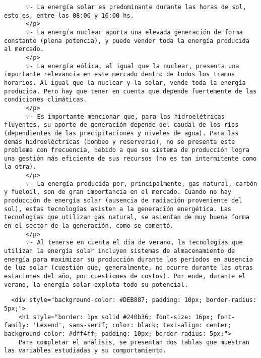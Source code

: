 \documentclass[11pt]{article}
\begin{document}
\begin{verbatim}
      💡- La energía solar es predominante durante las horas de sol, esto es, entre las 08:00 y 16:00 hs.
      </p>
      💡- La energía nuclear aporta una elevada generación de forma constante (plena potencia), y puede vender toda la energía producida al mercado.
      </p>
      💡- La energía eólica, al igual que la nuclear, presenta una importante relevancia en este mercado dentro de todos los tramos horarios. Al igual que la nuclear y la solar, vende toda la energía producida. Pero hay que tener en cuenta que depende fuertemente de las condiciones climáticas.
      </p>
      💡- Es importante mencionar que, para las hidroelétricas fluyentes, su aporte de generación depende del caudal de los ríos (dependientes de las precipitaciones y niveles de agua). Para las demás hidroeléctricas (bombeo y reservorio), no se presenta este problema con frecuencia, debido a que su sistema de producción logra una gestión más eficiente de sus recursos (no es tan intermitente como la otra).
      </p>
      💡- La energía producida por, principalmente, gas natural, carbón y fueloil, son de gran importancia en el mercado. Cuando no hay producción de energía solar (ausencia de radiación proveniente del sol), estas tecnologías asisten a la generación energética. Las tecnologías que utilizan gas natural, se asientan de muy buena forma en el sector de la generación, como se comentó.
      </p>
      💡- Al tenerse en cuenta el día de verano, la tecnologías que utilizan la energía solar incluyen sistemas de almacenamiento de energía para maximizar su producción durante los períodos en ausencia de luz solar (cuestión que, generalmente, no ocurre durante las otras estaciones del año, por cuestiones de costos). Por ende, durante el verano, la energía solar explota todo su potencial.
\end{verbatim}

    \begin{verbatim}
  <div style="background-color: #DEB887; padding: 10px; border-radius: 5px;">
    <h1 style="border: 1px solid #240b36; font-size: 16px; font-family: 'Lexend', sans-serif; color: black; text-align: center; background-color: #dff4ff; padding: 10px; border-radius: 5px;">
    Para completar el análisis, se presentan dos tablas que muestran las variables estudiadas y su comportamiento.
\end{verbatim}
\end{document}
